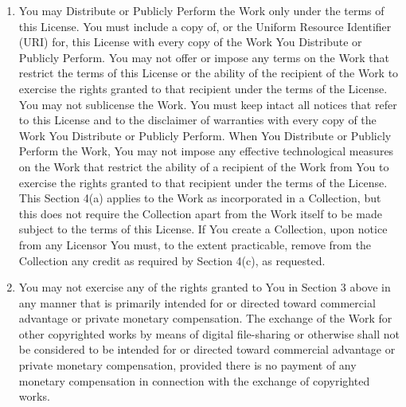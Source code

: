 \begin{enumerate}
\item You may Distribute or Publicly Perform the Work only under the terms of this License. You must include a copy of, or the Uniform Resource Identifier (URI) for, this License with every copy of the Work You Distribute or Publicly Perform. You may not offer or impose any terms on the Work that restrict the terms of this License or the ability of the recipient of the Work to exercise the rights granted to that recipient under the terms of the License. You may not sublicense the Work. You must keep intact all notices that refer to this License and to the disclaimer of warranties with every copy of the Work You Distribute or Publicly Perform. When You Distribute or Publicly Perform the Work, You may not impose any effective technological measures on the Work that restrict the ability of a recipient of the Work from You to exercise the rights granted to that recipient under the terms of the License. This Section 4(a) applies to the Work as incorporated in a Collection, but this does not require the Collection apart from the Work itself to be made subject to the terms of this License. If You create a Collection, upon notice from any Licensor You must, to the extent practicable, remove from the Collection any credit as required by Section 4(c), as requested.
\item You may not exercise any of the rights granted to You in Section 3 above in any manner that is primarily intended for or directed toward commercial advantage or private monetary compensation. The exchange of the Work for other copyrighted works by means of digital file-sharing or otherwise shall not be considered to be intended for or directed toward commercial advantage or private monetary compensation, provided there is no payment of any monetary compensation in connection with the exchange of copyrighted works.

\end{enumerate}
